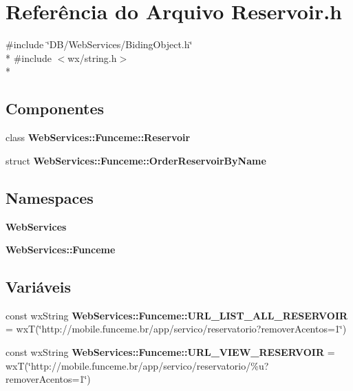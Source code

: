 \section{Referência do Arquivo Reservoir.\+h}
\label{_reservoir_8h}
{\ttfamily \#include \char`\"{}D\+B/\+Web\+Services/\+Biding\+Object.\+h\char`\"{}}\\*
{\ttfamily \#include $<$wx/string.\+h$>$}\\*
\subsection*{Componentes}
\begin{DoxyCompactItemize}
\item 
class {\bf Web\+Services\+::\+Funceme\+::\+Reservoir}
\item 
struct {\bf Web\+Services\+::\+Funceme\+::\+Order\+Reservoir\+By\+Name}
\end{DoxyCompactItemize}
\subsection*{Namespaces}
\begin{DoxyCompactItemize}
\item 
 {\bf Web\+Services}
\item 
 {\bf Web\+Services\+::\+Funceme}
\end{DoxyCompactItemize}
\subsection*{Variáveis}
\begin{DoxyCompactItemize}
\item 
const wx\+String {\bf Web\+Services\+::\+Funceme\+::\+U\+R\+L\+\_\+\+L\+I\+S\+T\+\_\+\+A\+L\+L\+\_\+\+R\+E\+S\+E\+R\+V\+O\+IR} = wxT(\char`\"{}http\+://mobile.\+funceme.\+br/app/servico/reservatorio?remover\+Acentos=1\char`\"{})
\item 
const wx\+String {\bf Web\+Services\+::\+Funceme\+::\+U\+R\+L\+\_\+\+V\+I\+E\+W\+\_\+\+R\+E\+S\+E\+R\+V\+O\+IR} = wxT(\char`\"{}http\+://mobile.\+funceme.\+br/app/servico/reservatorio/\%u?remover\+Acentos=1\char`\"{})
\end{DoxyCompactItemize}
